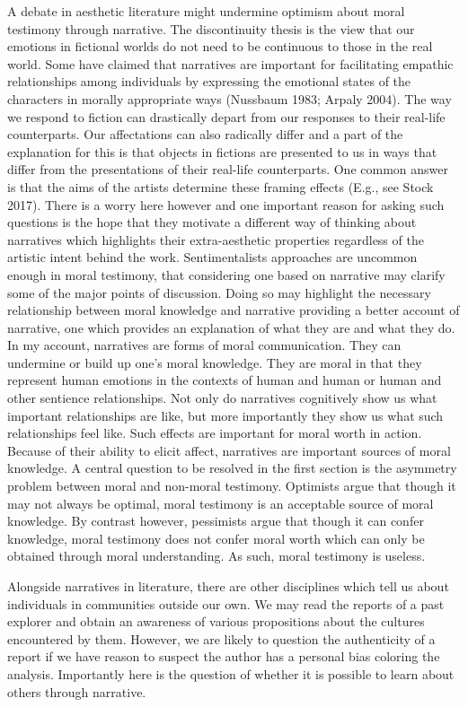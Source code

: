 \documentclass[
  letterpaper,
  DIV=11,
  numbers=noendperiod]{scrartcl}
\theoremstyle{remark}
\begin{document}
A debate in aesthetic literature might undermine optimism about moral
testimony through narrative. The discontinuity thesis is the view that
our emotions in fictional worlds do not need to be continuous to those
in the real world. Some have claimed that narratives are important for
facilitating empathic relationships among individuals by expressing the
emotional states of the characters in morally appropriate ways (Nussbaum
1983; Arpaly 2004). The way we respond to fiction can drastically depart
from our responses to their real-life counterparts. Our affectations can
also radically differ and a part of the explanation for this is that
objects in fictions are presented to us in ways that differ from the
presentations of their real-life counterparts. One common answer is that
the aims of the artists determine these framing effects (E.g., see Stock
2017). There is a worry here however and one important reason for asking
such questions is the hope that they motivate a different way of
thinking about narratives which highlights their extra-aesthetic
properties regardless of the artistic intent behind the work.
Sentimentalists approaches are uncommon enough in moral testimony, that
considering one based on narrative may clarify some of the major points
of discussion. Doing so may highlight the necessary relationship between
moral knowledge and narrative providing a better account of narrative,
one which provides an explanation of what they are and what they do. In
my account, narratives are forms of moral communication. They can
undermine or build up one's moral knowledge. They are moral in that they
represent human emotions in the contexts of human and human or human and
other sentience relationships. Not only do narratives cognitively show
us what important relationships are like, but more importantly they show
us what such relationships feel like. Such effects are important for
moral worth in action. Because of their ability to elicit affect,
narratives are important sources of moral knowledge. A central question
to be resolved in the first section is the asymmetry problem between
moral and non-moral testimony. Optimists argue that though it may not
always be optimal, moral testimony is an acceptable source of moral
knowledge. By contrast however, pessimists argue that though it can
confer knowledge, moral testimony does not confer moral worth which can
only be obtained through moral understanding. As such, moral testimony
is useless.

Alongside narratives in literature, there are other disciplines which
tell us about individuals in communities outside our own. We may read
the reports of a past explorer and obtain an awareness of various
propositions about the cultures encountered by them. However, we are
likely to question the authenticity of a report if we have reason to
suspect the author has a personal bias coloring the analysis.
Importantly here is the question of whether it is possible to learn
about others through narrative.
\end{document}
